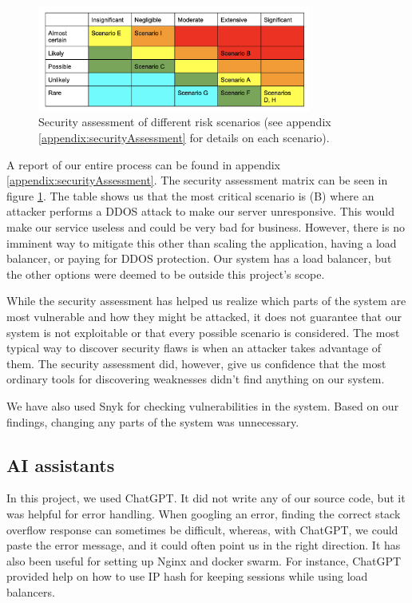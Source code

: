 \begin{figure}[H]
    \centering
    \includegraphics[width=0.8\textwidth]{images/securityAssessment.png}
    \caption{Security assessment of different risk scenarios (see appendix \ref{appendix:securityAssessment} for details on each scenario).}
    \label{fig:securityAssessmentTable}
\end{figure}

A report of our entire process can be found in appendix \ref{appendix:securityAssessment}. The security assessment matrix can be seen in figure \ref{fig:securityAssessmentTable}. The table shows us that the most critical scenario is (B) where an attacker performs a DDOS attack to make our server unresponsive. This would make our service useless and could be very bad for business. However, there is no imminent way to mitigate this other than scaling the application, having a load balancer, or paying for DDOS protection. Our system has a load balancer, but the other options were deemed to be outside this project's scope.

While the security assessment has helped us realize which parts of the system are most vulnerable and how they might be attacked, it does not guarantee that our system is not exploitable or that every possible scenario is considered. The most typical way to discover security flaws is when an attacker takes advantage of them. The security assessment did, however, give us confidence that the most ordinary tools for discovering weaknesses didn't find anything on our system. 

We have also used Snyk for checking vulnerabilities in the system. Based on our findings, changing any parts of the system was unnecessary.

\subsection{AI assistants}
In this project, we used ChatGPT. It did not write any of our source code, but it was helpful for error handling. When googling an error, finding the correct stack overflow response can sometimes be difficult, whereas, with ChatGPT, we could paste the error message, and it could often point us in the right direction. It has also been useful for setting up Nginx and docker swarm. For instance, ChatGPT provided help on how to use IP hash for keeping sessions while using load balancers.

